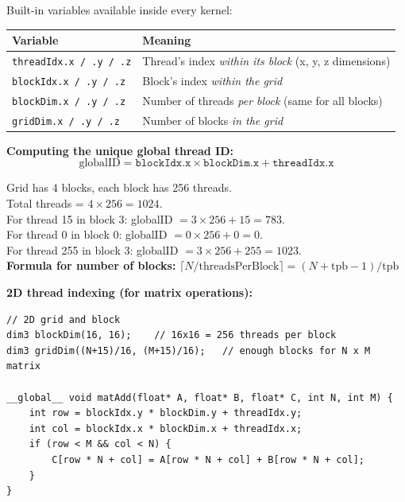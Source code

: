 \documentclass[11pt,a4paper]{article}
\newcommand{\code}[1]{\texttt{\small\colorbox{codebg}{\color{codekw}#1}}}
\begin{document}
Built-in variables available inside every kernel:

\begin{center}
\begin{tabular}{L{4cm} L{9cm}}
\toprule
\textbf{Variable} & \textbf{Meaning} \\
\midrule
\code{threadIdx.x / .y / .z} & Thread's index \textit{within its block} (x, y, z dimensions) \\
\code{blockIdx.x / .y / .z}  & Block's index \textit{within the grid} \\
\code{blockDim.x / .y / .z}  & Number of threads \textit{per block} (same for all blocks) \\
\code{gridDim.x / .y / .z}   & Number of blocks \textit{in the grid} \\
\bottomrule
\end{tabular}
\end{center}

\textbf{Computing the unique global thread ID:}
\[
\boxed{\text{globalID} = \texttt{blockIdx.x} \times \texttt{blockDim.x} + \texttt{threadIdx.x}}
\]

\begin{myexample}
Grid has 4 blocks, each block has 256 threads.\\
Total threads = $4 \times 256 = 1024$.\\
For thread 15 in block 3: globalID $= 3 \times 256 + 15 = 783$.\\
For thread 0 in block 0: globalID $= 0 \times 256 + 0 = 0$.\\
For thread 255 in block 3: globalID $= 3 \times 256 + 255 = 1023$.\\
\textbf{Formula for number of blocks:} $\lceil N / \text{threadsPerBlock} \rceil = (N + \text{tpb} - 1) / \text{tpb}$
\end{myexample}

\textbf{2D thread indexing (for matrix operations):}
\begin{lstlisting}
// 2D grid and block
dim3 blockDim(16, 16);    // 16x16 = 256 threads per block
dim3 gridDim((N+15)/16, (M+15)/16);   // enough blocks for N x M matrix

__global__ void matAdd(float* A, float* B, float* C, int N, int M) {
    int row = blockIdx.y * blockDim.y + threadIdx.y;
    int col = blockIdx.x * blockDim.x + threadIdx.x;
    if (row < M && col < N) {
        C[row * N + col] = A[row * N + col] + B[row * N + col];
    }
}
\end{lstlisting}
\end{document}

